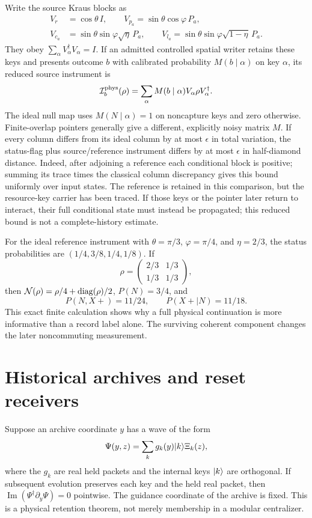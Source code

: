 Write the source Kraus blocks as
\[
\begin{split}
 V_r&=\cos\theta\,I,\qquad
 V_{p_a}=\sin\theta\cos\varphi\,P_a,\\
 V_{c_a}&=\sin\theta\sin\varphi\sqrt\eta\,P_a,\qquad
 V_{l_a}=\sin\theta\sin\varphi\sqrt{1-\eta}\,P_a.
\end{split}
\]
They obey $\sum_\alpha V_\alpha^\dagger V_\alpha=I$. If an admitted controlled spatial writer retains these keys and presents outcome $b$ with calibrated probability $M(b\mid\alpha)$ on key $\alpha$, its reduced source instrument is
\[
 \mathcal I_b^{\rm phys}(\rho)
   =\sum_\alpha M(b\mid\alpha)V_\alpha\rho V_\alpha^\dagger.
\]
The ideal null map uses $M(N\mid\alpha)=1$ on noncapture keys and zero otherwise. Finite-overlap pointers generally give a different, explicitly noisy matrix $M$. If every column differs from its ideal column by at most $\epsilon$ in total variation, the status-flag plus source/reference instrument differs by at most $\epsilon$ in half-diamond distance. Indeed, after adjoining a reference each conditional block is positive; summing its trace times the classical column discrepancy gives this bound uniformly over input states. The reference is retained in this comparison, but the resource-key carrier has been traced. If those keys or the pointer later return to interact, their full conditional state must instead be propagated; this reduced bound is not a complete-history estimate.

For the ideal reference instrument with $\theta=\pi/3$, $\varphi=\pi/4$, and $\eta=2/3$, the status probabilities are $(1/4,3/8,1/4,1/8)$. If
\[
\rho=\begin{pmatrix}2/3&1/3\\1/3&1/3\end{pmatrix},
\]
then $\mathcal N(\rho)=\rho/4+\operatorname{diag}(\rho)/2$, $P(N)=3/4$, and
\[
P(N,X+)=11/24,\qquad P(X+\mid N)=11/18.
\]
This exact finite calculation shows why a full physical continuation is more informative than a record label alone. The surviving coherent component changes the later noncommuting measurement.

\section{Historical archives and reset receivers}\label{section:massive:historical-archives-and-reset-receivers}
Suppose an archive coordinate $y$ has a wave of the form
\[
\Psi(y,z)=\sum_k g_k(y)\lvert k\rangle\Xi_k(z),
\]
where the $g_k$ are real held packets and the internal keys $\lvert k\rangle$ are orthogonal. If subsequent evolution preserves each key and the held real packet, then
$\operatorname{Im}(\Psi^\dagger\partial_y\Psi)=0$ pointwise. The guidance coordinate of the archive is fixed. This is a physical retention theorem, not merely membership in a modular centralizer.

